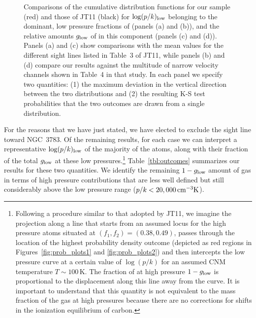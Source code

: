 \documentclass[modern]{aastex63}
\newcommand{\cmk}{\ensuremath{\,\rm{cm^{-3}K}}}
\begin{document}
\begin{figure}[b]
\caption{Comparisons of the cumulative distribution functions for our sample (red) and those 
of JT11 (black) for $\log (p/k)_{\rm low}$ belonging to the dominant, low pressure fractions of 
 (panels (a) and (b)), and the relative amounts $g_{\rm low}$ of  in this 
component (panels (c) and (d)).  Panels (a) and (c) show comparisons with the mean values for 
the different sight lines listed in Table~3 of JT11, while panels (b) and (d) compare our results 
against the multitude of narrow velocity channels shown in Table~4 in that study.  In each panel 
we specify two quantities: (1) the maximum deviation in the vertical direction between the two 
distributions and (2) the resulting K-S test probabilities that the two outcomes are drawn from a 
single distribution.\label{fig:cumulatives}}
\end{figure}

For the reasons that we have just stated, we have elected to exclude the sight line toward 
NGC~3783.  Of the remaining results, for each case we can interpret a representative $\log 
(p/k)_{\rm low}$ of the majority of the  atoms, along with their fraction of the total 
$g_{\rm low}$ at these low pressures.\footnote{Following a procedure similar to that adopted 
by JT11, we imagine the projection along a line that starts from an assumed locus for the high 
pressure  atoms situated at $(f_1,f_2)=(0.38,0.49)$, passes through the location of 
the highest probability density outcome (depicted as red regions in 
Figures~\ref{fig:prob_plots1} and \ref{fig:prob_plots2}) and then intercepts the low pressure 
curve at a certain value of $\log (p/k)$ for an assumed CNM temperature $T\sim 100\,$K.  The 
fraction of  at high pressure $1-g_{\rm low}$ is proportional to the displacement 
along this line away from the curve.  It is important to understand that this quantity is not 
equivalent to the mass fraction of the gas at high pressures because there are no corrections 
for shifts in the ionization equilibrium of carbon.}  Table~\ref{tbl:outcomes} summarizes our 
results for these two quantities.  We identify the remaining $1-g_{\rm low}$ amount of gas in 
terms of high pressure contributions that are less well defined but still considerably above the 
low pressure range ($p/k\lt 20,000\cmk$).
\end{document}
